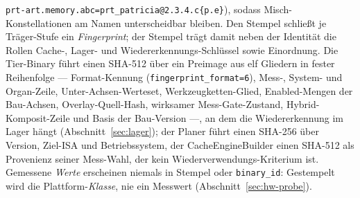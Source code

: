 \begin{nurkurz}
\texttt{prt-art.memory.abc=prt\_patricia@2.3.4.c\{p.e\}}), sodass Misch-Konstellationen am Namen unterscheidbar
bleiben. Den Stempel schließt je Träger-Stufe ein \emph{Fingerprint}; der Stempel trägt damit neben der
Identität die Rollen Cache-, Lager- und Wiedererkennungs-Schlüssel sowie Einordnung. Die Tier-Binary führt
einen SHA-512 über ein Preimage aus elf Gliedern in fester Reihenfolge --- Format-Kennung
(\texttt{fingerprint\_format=6}), Mess-, System- und Organ-Zeile, Unter-Achsen-Werteset, Werkzeugketten-Glied,
Enabled-Mengen der Bau-Achsen, Overlay-Quell-Hash, wirksamer Mess-Gate-Zustand, Hybrid-Komposit-Zeile und
Basis der Bau-Version ---, an dem die Wiedererkennung im Lager hängt (Abschnitt~\ref{sec:lager}); der Planer
führt einen SHA-256 über Version, Ziel-ISA und Betriebssystem, der CacheEngineBuilder einen SHA-512 als
Provenienz seiner Mess-Wahl, der kein Wiederverwendungs-Kriterium ist. Gemessene \emph{Werte} erscheinen
niemals in Stempel oder \texttt{binary\_id}: Gestempelt wird die Plattform-\emph{Klasse}, nie ein Messwert
(Abschnitt~\ref{sec:hw-probe}).

\end{nurkurz}
